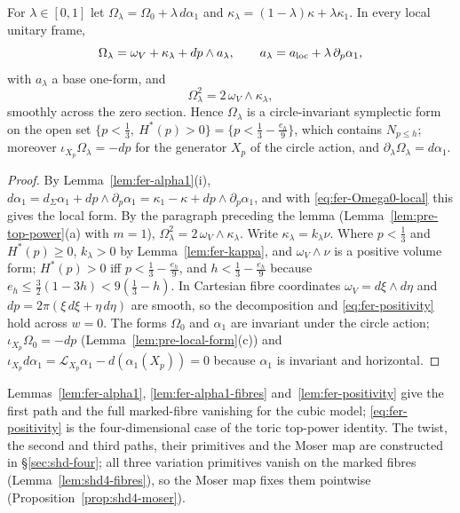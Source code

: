 \begin{lemma}[Positivity]\label{lem:fer-positivity}
For $\lambda\in[0,1]$ let $\Omega_\lambda=\Omega_0+\lambda\,d\alpha_1$ and $\kappa_\lambda=(1-\lambda)\kappa+\lambda\kappa_1$. In every local unitary
frame,
\[
 \Omega_\lambda=\omega_V+\kappa_\lambda+dp\wedge a_\lambda,\qquad a_\lambda=a_{\rm loc}+\lambda\,\partial_p\alpha_1,
\]
with $a_\lambda$ a base one-form, and
\begin{equation}\label{eq:fer-positivity}
 \Omega_\lambda^2=2\,\omega_V\wedge\kappa_\lambda ,
\end{equation}
smoothly across the zero section. Hence $\Omega_\lambda$ is a circle-invariant symplectic form on the open set
$\{p<\frac13,\ H^*(p)>0\}=\{p<\frac13-\frac{e_h}9\}$, which contains $N_{p\le h}$; moreover $\iota_{X_p}\Omega_\lambda=-dp$ for the
generator $X_p$ of the circle action, and $\partial_\lambda\Omega_\lambda=d\alpha_1$.
\end{lemma}

\begin{proof}
By Lemma~\ref{lem:fer-alpha1}(i), $d\alpha_1=d_\Sigma\alpha_1+dp\wedge\partial_p\alpha_1=\kappa_1-\kappa+dp\wedge\partial_p\alpha_1$, and with
\eqref{eq:fer-Omega0-local} this gives the local form. By the paragraph preceding the lemma (Lemma~\ref{lem:pre-top-power}(a) with
$m=1$), $\Omega_\lambda^2=2\,\omega_V\wedge\kappa_\lambda$. Write $\kappa_\lambda=k_\lambda\nu$. Where $p<\frac13$ and $H^*(p)\ge0$, $k_\lambda>0$ by
Lemma~\ref{lem:fer-kappa}, and $\omega_V\wedge\nu$ is a positive volume form; $H^*(p)>0$ iff $p<\frac13-\frac{e_h}9$, and
$h<\frac13-\frac{e_h}9$ because $e_h\le\frac32(1-3h)<9(\frac13-h)$. In Cartesian fibre coordinates $\omega_V=d\xi\wedge d\eta$ and
$dp=2\pi(\xi\,d\xi+\eta\,d\eta)$ are smooth, so the decomposition and \eqref{eq:fer-positivity} hold across $w=0$. The forms $\Omega_0$
and $\alpha_1$ are invariant under the circle action; $\iota_{X_p}\Omega_0=-dp$ (Lemma~\ref{lem:pre-local-form}(c)) and
$\iota_{X_p}d\alpha_1=\mathcal L_{X_p}\alpha_1-d(\alpha_1(X_p))=0$ because $\alpha_1$ is invariant and horizontal.
\end{proof}

Lemmas~\ref{lem:fer-alpha1}, \ref{lem:fer-alpha1-fibres} and~\ref{lem:fer-positivity} give the first path and the full marked-fibre vanishing for the cubic model; \eqref{eq:fer-positivity} is the four-dimensional case of the toric
top-power identity. The twist, the second and third paths, their primitives and the Moser map are constructed in
\S\ref{sec:shd-four}; all three variation primitives vanish on the marked fibres (Lemma~\ref{lem:shd4-fibres}), so
the Moser map fixes them pointwise (Proposition~\ref{prop:shd4-moser}).



